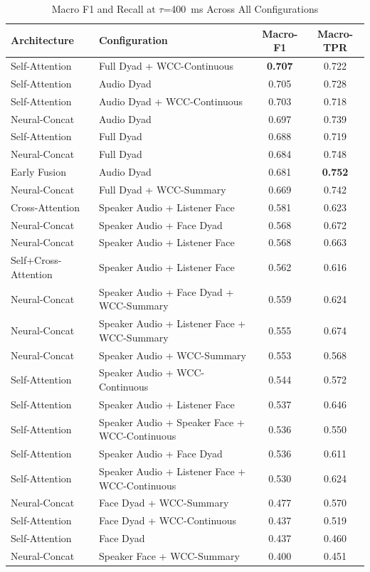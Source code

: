 \begin{table}[h]
\caption{Macro F1 and Recall at $\tau$=400~ms Across All Configurations}
\label{tab:overall_macro_leaderboard}
\begin{tabular}{llcc}
\toprule
Architecture & Configuration & Macro-F1 & Macro-TPR \\
\midrule
Self-Attention & Full Dyad + WCC-Continuous & \textbf{0.707} & 0.722 \\
Self-Attention & Audio Dyad & 0.705 & 0.728 \\
Self-Attention & Audio Dyad + WCC-Continuous & 0.703 & 0.718 \\
Neural-Concat & Audio Dyad & 0.697 & 0.739 \\
Self-Attention & Full Dyad & 0.688 & 0.719 \\
Neural-Concat & Full Dyad & 0.684 & 0.748 \\
Early Fusion & Audio Dyad & 0.681 & \textbf{0.752} \\
Neural-Concat & Full Dyad + WCC-Summary & 0.669 & 0.742 \\
Cross-Attention & Speaker Audio + Listener Face & 0.581 & 0.623 \\
Neural-Concat & Speaker Audio + Face Dyad & 0.568 & 0.672 \\
Neural-Concat & Speaker Audio + Listener Face & 0.568 & 0.663 \\
Self+Cross-Attention & Speaker Audio + Listener Face & 0.562 & 0.616 \\
Neural-Concat & Speaker Audio + Face Dyad + WCC-Summary & 0.559 & 0.624 \\
Neural-Concat & Speaker Audio + Listener Face + WCC-Summary & 0.555 & 0.674 \\
Neural-Concat & Speaker Audio + WCC-Summary & 0.553 & 0.568 \\
Self-Attention & Speaker Audio + WCC-Continuous & 0.544 & 0.572 \\
Self-Attention & Speaker Audio + Listener Face & 0.537 & 0.646 \\
Self-Attention & Speaker Audio + Speaker Face + WCC-Continuous & 0.536 & 0.550 \\
Self-Attention & Speaker Audio + Face Dyad & 0.536 & 0.611 \\
Self-Attention & Speaker Audio + Listener Face + WCC-Continuous & 0.530 & 0.624 \\
Neural-Concat & Face Dyad + WCC-Summary & 0.477 & 0.570 \\
Self-Attention & Face Dyad + WCC-Continuous & 0.437 & 0.519 \\
Self-Attention & Face Dyad & 0.437 & 0.460 \\
Neural-Concat & Speaker Face + WCC-Summary & 0.400 & 0.451 \\
\bottomrule
\end{tabular}
\end{table}
